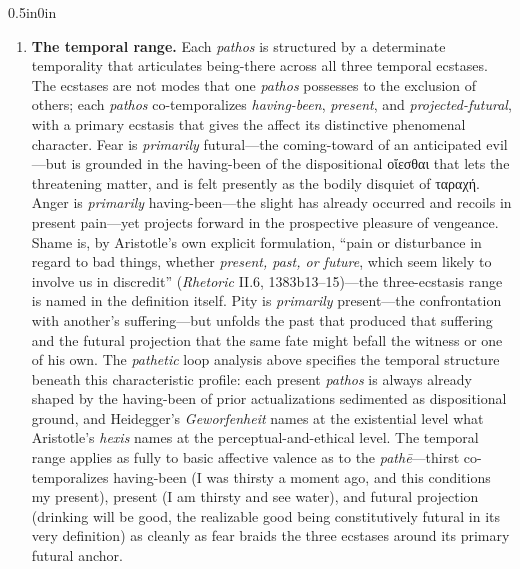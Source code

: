 \documentclass{article}
\newcommand{\gk}[1]{{\greekfont #1}}
\begin{document}
\begin{adjustwidth}{0.5in}{0in}
\begin{enumerate}
        \item \textbf{The temporal range.} Each \textit{pathos} is structured by a determinate temporality that articulates being-there across all three temporal ecstases. The ecstases are not modes that one \textit{pathos} possesses to the exclusion of others; each \textit{pathos} co-temporalizes \textit{having-been}, \textit{present}, and \textit{projected-futural}, with a primary ecstasis that gives the affect its distinctive phenomenal character. Fear is \textit{primarily} futural---the coming-toward of an anticipated evil---but is grounded in the having-been of the dispositional \gk{οἴεσθαι} that lets the threatening matter, and is felt presently as the bodily disquiet of \gk{ταραχή}. Anger is \textit{primarily} having-been---the slight has already occurred and recoils in present pain---yet projects forward in the prospective pleasure of vengeance. Shame is, by Aristotle's own explicit formulation, ``pain or disturbance in regard to bad things, whether \textit{present, past, or future}, which seem likely to involve us in discredit'' (\textit{Rhetoric} II.6, 1383b13--15)---the three-ecstasis range is named in the definition itself. Pity is \textit{primarily} present---the confrontation with another's suffering---but unfolds the past that produced that suffering and the futural projection that the same fate might befall the witness or one of his own. The \textit{pathetic} loop analysis above specifies the temporal structure beneath this characteristic profile: each present \textit{pathos} is always already shaped by the having-been of prior actualizations sedimented as dispositional ground, and Heidegger's \textit{Geworfenheit} names at the existential level what Aristotle's \textit{hexis} names at the perceptual-and-ethical level. The temporal range applies as fully to basic affective valence as to the \textit{pathē}---thirst co-temporalizes having-been (I was thirsty a moment ago, and this conditions my present), present (I am thirsty and see water), and futural projection (drinking will be good, the realizable good being constitutively futural in its very definition) as cleanly as fear braids the three ecstases around its primary futural anchor. 
        

\end{enumerate}
\end{adjustwidth}
\end{document}
